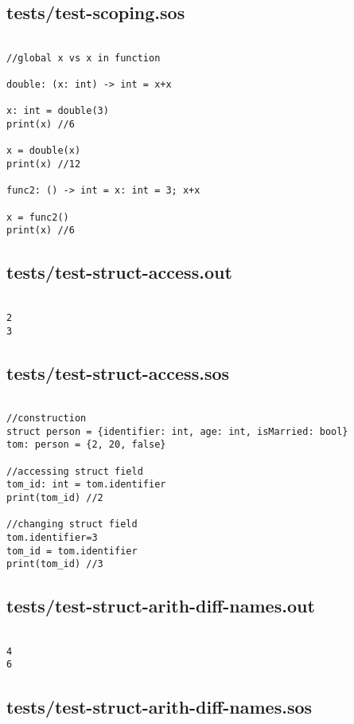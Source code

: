 \documentclass[main.tex]{subfiles}
\begin{document}
\subsection{tests/test-scoping.sos}

\begin{lstlisting}

//global x vs x in function

double: (x: int) -> int = x+x

x: int = double(3)
print(x) //6

x = double(x)
print(x) //12

func2: () -> int = x: int = 3; x+x

x = func2()
print(x) //6
\end{lstlisting}

\subsection{tests/test-struct-access.out}

\begin{lstlisting}

2
3
\end{lstlisting}

\subsection{tests/test-struct-access.sos}

\begin{lstlisting}

//construction
struct person = {identifier: int, age: int, isMarried: bool}
tom: person = {2, 20, false}

//accessing struct field
tom_id: int = tom.identifier
print(tom_id) //2

//changing struct field
tom.identifier=3
tom_id = tom.identifier
print(tom_id) //3

\end{lstlisting}

\subsection{tests/test-struct-arith-diff-names.out}

\begin{lstlisting}

4
6
\end{lstlisting}

\subsection{tests/test-struct-arith-diff-names.sos}
\end{document}
